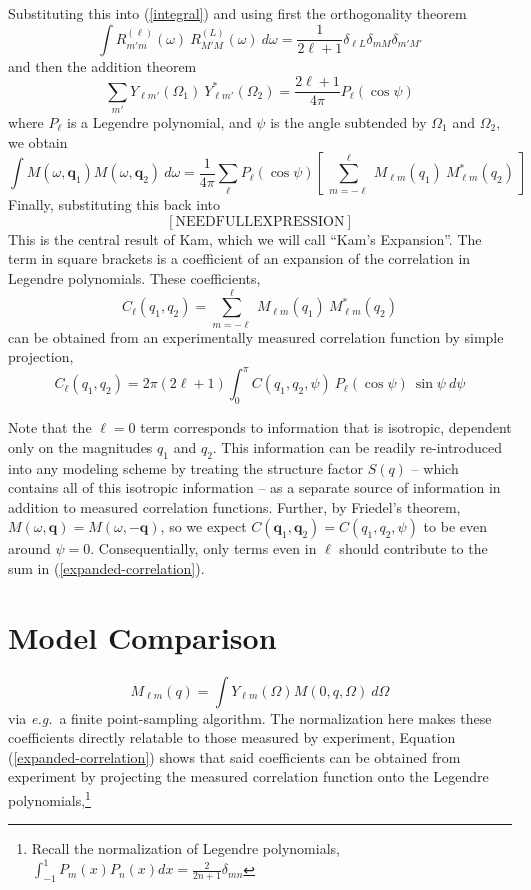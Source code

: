 \documentclass[aps,prl,preprint,groupedaddress]{revtex4-1}
\def\*#1{\mathbf{#1}}
\begin{document}
Substituting this into (\ref{integral}) and using first the orthogonality theorem
\[
\int R_{m' m}^{(\ell)} (\omega) \> R_{M' M}^{(L)} (\omega) \> d\omega = \frac{1}{2 \ell + 1} \delta_{\ell L} \delta_{m M} \delta_{m' M'}
\]
and then the addition theorem
\[
\sum_{m'} Y_{\ell m'} (\Omega_1) \> Y_{\ell m'}^* (\Omega_2) = \frac{2 \ell + 1}{ 4 \pi} P_\ell (\cos \psi)
\]
where $P_\ell$ is a Legendre polynomial, and $\psi$ is the angle subtended by $\Omega_1$ and $\Omega_2$, we obtain
\begin{equation}\label{expanded}
\int M( \omega, \*{q}_1 ) M( \omega, \*{q}_2 ) \> d \omega = \frac{1}{4 \pi} \sum_{\ell} P_\ell (\cos \psi) \left[ \> \sum_{m = -\ell}^{\ell}  \> M_{\ell m} (q_1) \> M_{\ell m}^* (q_2) \> \right]
\end{equation}
Finally, substituting this back into
\begin{equation}\label{kamtheorem}
\mathrm{ [NEED FULL EXPRESSION]}
\end{equation}
This is the central result of Kam, which we will call ``Kam's Expansion''. The term in square brackets is a coefficient of an expansion of the correlation in Legendre polynomials. These coefficients,
\[
C_\ell (q_1, q_2) = \sum_{m = -\ell}^{\ell}  \> M_{\ell m} (q_1) \> M_{\ell m}^* (q_2)
\]
can be obtained from an experimentally measured correlation function by simple projection,
\[
C_\ell (q_1, q_2) = 2 \pi (2 \ell + 1 ) \int_{0}^{\pi} C( q_1, q_2, \psi ) \> P_\ell (\cos \psi ) \> \sin \psi \> d \psi
\]

Note that the $\ell = 0$ term corresponds to information that is isotropic, dependent only on the magnitudes $q_1$ and $q_2$. This information can be readily re-introduced into any modeling scheme by treating the structure factor $S(q)$ -- which contains all of this isotropic information -- as a separate source of information in addition to measured correlation functions. Further, by Friedel's theorem, $M(\omega, \*q) = M(\omega, - \*q)$, so we expect $C( \*q_1, \*q_2 ) = C( q_1, q_2, \psi )$ to be even around $\psi = 0$. Consequentially, only terms even in $\ell$ should contribute to the sum in (\ref{expanded-correlation}).


\section*{Model Comparison}


\begin{equation}\label{M}
M_{\ell m} (q) =  \int Y_{\ell m} (\Omega) M( 0, q, \Omega ) \> d \Omega
\end{equation}
via \textit{e.g.}~a finite point-sampling algorithm. The normalization here makes these coefficients directly relatable to those measured by experiment, 
Equation (\ref{expanded-correlation}) shows that said coefficients can be obtained from experiment by projecting the measured correlation function onto the Legendre polynomials,\footnote{Recall the normalization of Legendre polynomials, $\int_{-1}^{1} P_m (x) P_n(x) dx = \frac{2}{2n + 1} \delta_{mn}$}
\end{document}
